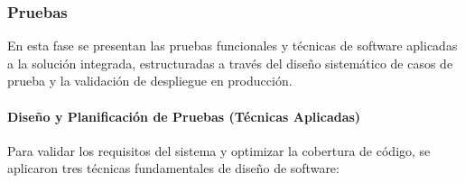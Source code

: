 \subsubsection{Pruebas}

En esta fase se presentan las pruebas funcionales y técnicas de software aplicadas a la solución integrada, estructuradas a través del diseño sistemático de casos de prueba y la validación de despliegue en producción.

\paragraph{Diseño y Planificación de Pruebas (Técnicas Aplicadas)}
Para validar los requisitos del sistema y optimizar la cobertura de código, se aplicaron tres técnicas fundamentales de diseño de software:

